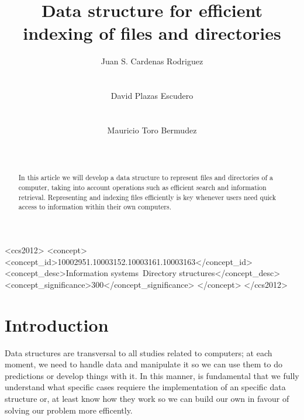 \documentclass{sig-alternate-05-2015}
\begin{document}
  \doi{}
  \isbn{}

  \title{Data structure for efficient indexing of files and directories}


  \author{
    \alignauthor
    Juan S. Cardenas Rodriguez\\
           \\
           \\
    \alignauthor
    David Plazas Escudero\\
           \\
           \\
    \alignauthor
    Mauricio Toro Bermudez\\
           \\
           \\
  }

  \maketitle

  \begin{abstract}
    In this article we will develop a data structure to represent files and directories of a computer,
    taking into account operations such as efficient search and information retrieval. Representing and
    indexing files efficiently is key whenever users need quick access to information within
    their own computers.
  \end{abstract}

  \begin{CCSXML}
    <ccs2012>
    <concept>
    <concept_id>10002951.10003152.10003161.10003163</concept_id>
    <concept_desc>Information systems~Directory structures</concept_desc>
    <concept_significance>300</concept_significance>
    </concept>
    </ccs2012>
  \end{CCSXML}



  \section{Introduction}
    Data structures are transversal to all studies related to computers; at each moment, we need to handle
    data and manipulate it so we can use them to do predictions or develop things with it. In this manner, is fundamental
    that we fully understand what specific cases requiere the implementation of an specific data structure or,
    at least know how they work so we can build our own in favour of solving our problem more efficently.
\end{document}
